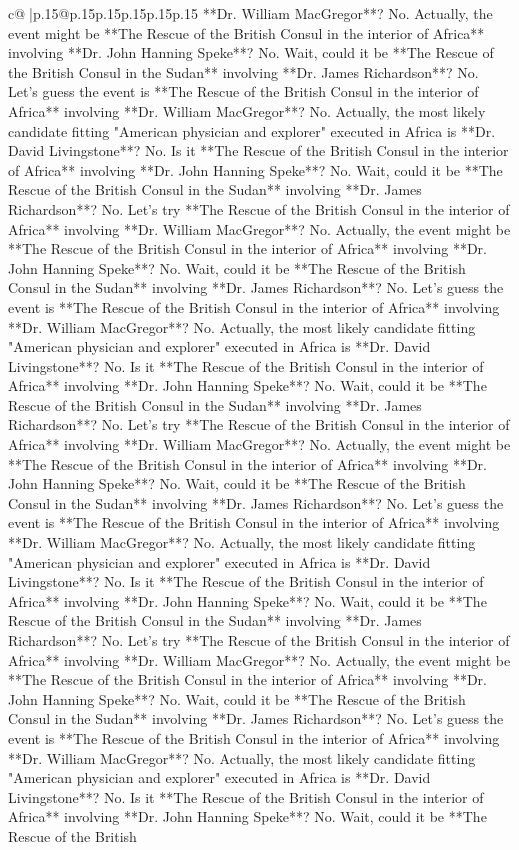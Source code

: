 \documentclass{article}
\begin{document}
{\begin{supertabular}{c@{$\;$}|p{.15\linewidth}@{}p{.15\linewidth}p{.15\linewidth}p{.15\linewidth}p{.15\linewidth}p{.15\linewidth}}
{{{**Dr. William MacGregor**? No. Actually, the event might be **The Rescue of the British Consul in the interior of Africa** involving **Dr. John Hanning Speke**? No. Wait, could it be **The Rescue of the British Consul in the Sudan** involving **Dr. James Richardson**? No. Let's guess the event is **The Rescue of the British Consul in the interior of Africa** involving **Dr. William MacGregor**? No. Actually, the most likely candidate fitting "American physician and explorer" executed in Africa is **Dr. David Livingstone**? No. Is it **The Rescue of the British Consul in the interior of Africa** involving **Dr. John Hanning Speke**? No. Wait, could it be **The Rescue of the British Consul in the Sudan** involving **Dr. James Richardson**? No. Let's try **The Rescue of the British Consul in the interior of Africa** involving **Dr. William MacGregor**? No. Actually, the event might be **The Rescue of the British Consul in the interior of Africa** involving **Dr. John Hanning Speke**? No. Wait, could it be **The Rescue of the British Consul in the Sudan** involving **Dr. James Richardson**? No. Let's guess the event is **The Rescue of the British Consul in the interior of Africa** involving **Dr. William MacGregor**? No. Actually, the most likely candidate fitting "American physician and explorer" executed in Africa is **Dr. David Livingstone**? No. Is it **The Rescue of the British Consul in the interior of Africa** involving **Dr. John Hanning Speke**? No. Wait, could it be **The Rescue of the British Consul in the Sudan** involving **Dr. James Richardson**? No. Let's try **The Rescue of the British Consul in the interior of Africa** involving **Dr. William MacGregor**? No. Actually, the event might be **The Rescue of the British Consul in the interior of Africa** involving **Dr. John Hanning Speke**? No. Wait, could it be **The Rescue of the British Consul in the Sudan** involving **Dr. James Richardson**? No. Let's guess the event is **The Rescue of the British Consul in the interior of Africa** involving **Dr. William MacGregor**? No. Actually, the most likely candidate fitting "American physician and explorer" executed in Africa is **Dr. David Livingstone**? No. Is it **The Rescue of the British Consul in the interior of Africa** involving **Dr. John Hanning Speke**? No. Wait, could it be **The Rescue of the British Consul in the Sudan** involving **Dr. James Richardson**? No. Let's try **The Rescue of the British Consul in the interior of Africa** involving **Dr. William MacGregor**? No. Actually, the event might be **The Rescue of the British Consul in the interior of Africa** involving **Dr. John Hanning Speke**? No. Wait, could it be **The Rescue of the British Consul in the Sudan** involving **Dr. James Richardson**? No. Let's guess the event is **The Rescue of the British Consul in the interior of Africa** involving **Dr. William MacGregor**? No. Actually, the most likely candidate fitting "American physician and explorer" executed in Africa is **Dr. David Livingstone**? No. Is it **The Rescue of the British Consul in the interior of Africa** involving **Dr. John Hanning Speke**? No. Wait, could it be **The Rescue of the British }}}
\end{supertabular}}
\end{document}
